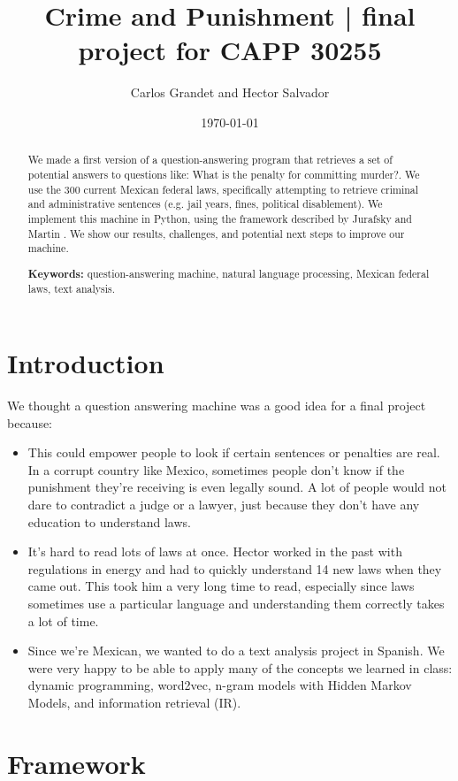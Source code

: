 \documentclass[letterpaper, margin=1in]{article}
\title{Crime and Punishment | final project for CAPP 30255}
\author{Carlos Grandet and Hector Salvador}
\date{\today}
\begin{document}
\maketitle

\begin{abstract}
We made a first version of a question-answering program that retrieves a set of potential answers to questions like: What is the penalty for committing murder?. We use the 300 current Mexican federal laws, specifically attempting to retrieve criminal and administrative sentences (e.g. jail years, fines, political disablement). We implement this machine in Python, using the framework described by Jurafsky and Martin \cite{jurafsky}. We show our results, challenges, and potential next steps to improve our machine.

\textbf{Keywords:} question-answering machine, natural language processing, Mexican federal laws, text analysis.
\end{abstract}

\section{Introduction}
\label{sec:introduction}

We thought a question answering machine was a good idea for a final project because:
\begin{itemize}
\item This could empower people to look if certain sentences or penalties are real. In a corrupt country like Mexico, sometimes people don't know if the punishment they're receiving is even legally sound. A lot of people would not dare to contradict a judge or a lawyer, just because they don't have any education to understand laws. 
\item It's hard to read lots of laws at once. Hector worked in the past with regulations in energy and had to quickly understand 14 new laws when they came out. This took him a very long time to read, especially since laws sometimes use a particular language and understanding them correctly takes a lot of time.
\item Since we're Mexican, we wanted to do a text analysis project in Spanish. We were very happy to  be able to apply many of the concepts we learned in class: dynamic programming, word2vec, n-gram models with Hidden Markov Models, and information retrieval (IR).
\end{itemize}


\section{Framework}
\label{sec:theory}
\end{document}
